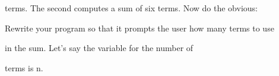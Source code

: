 terms. The second computes a sum of six terms. Now do the obvious:

Rewrite your program so that it prompts the user how many terms to use

in the sum. Let's say the variable for the number of

terms is n.

